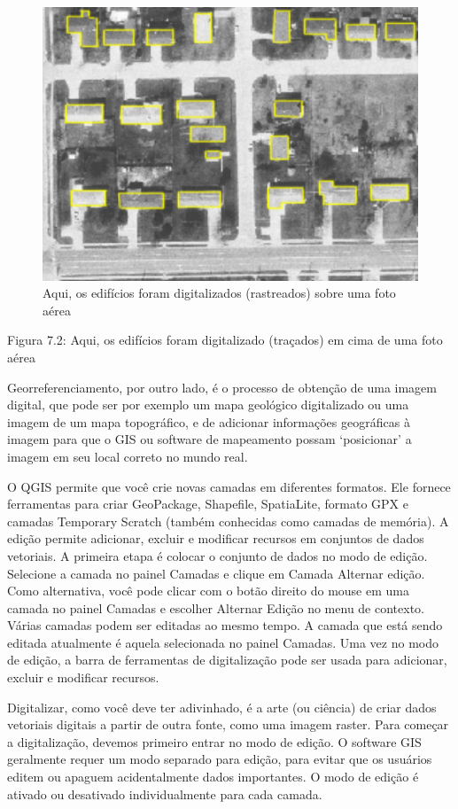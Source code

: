 \documentclass[
]{krantz}
\begin{document}
\begin{figure}
\centering
\includegraphics{media/modulo7/buildings.png}
\caption{Aqui, os edifícios foram digitalizados (rastreados) sobre uma foto aérea}
\end{figure}

Figura 7.2: Aqui, os edifícios foram digitalizado (traçados) em cima de uma foto aérea

Georreferenciamento, por outro lado, é o processo de obtenção de uma imagem digital, que pode ser por exemplo um mapa geológico digitalizado ou uma imagem de um mapa topográfico, e de adicionar informações geográficas à imagem para que o GIS ou software de mapeamento possam `posicionar' a imagem em seu local correto no mundo real.

O QGIS permite que você crie novas camadas em diferentes formatos. Ele fornece ferramentas para criar GeoPackage, Shapefile, SpatiaLite, formato GPX e camadas Temporary Scratch (também conhecidas como camadas de memória). A edição permite adicionar, excluir e modificar recursos em conjuntos de dados vetoriais. A primeira etapa é colocar o conjunto de dados no modo de edição. Selecione a camada no painel Camadas e clique em Camada \textbar{} Alternar edição. Como alternativa, você pode clicar com o botão direito do mouse em uma camada no painel Camadas e escolher Alternar Edição no menu de contexto. Várias camadas podem ser editadas ao mesmo tempo. A camada que está sendo editada atualmente é aquela selecionada no painel Camadas. Uma vez no modo de edição, a barra de ferramentas de digitalização pode ser usada para adicionar, excluir e modificar recursos.

Digitalizar, como você deve ter adivinhado, é a arte (ou ciência) de criar dados vetoriais digitais a partir de outra fonte, como uma imagem raster. Para começar a digitalização, devemos primeiro entrar no modo de edição. O software GIS geralmente requer um modo separado para edição, para evitar que os usuários editem ou apaguem acidentalmente dados importantes. O modo de edição é ativado ou desativado individualmente para cada camada.
\end{document}
